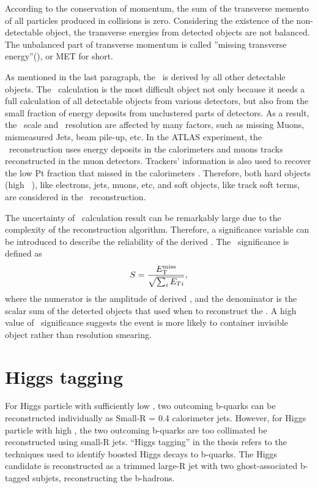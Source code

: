 \label{sec:met}
\par According to the conservation of momentum, the sum of the transverse memento of all particles produced in collisions is zero. Considering the existence of the non-detectable object, the transverse energies from detected objects are not balanced. The unbalanced part of transverse momentum is called ''missing transverse energy''(\met), or MET for short.

\par As mentioned in the last paragraph, the \met~is derived by all other detectable objects. The \met~calculation is the most difficult object not only because it needs a full calculation of all detectable objects from various detectors, but also from the small fraction of energy deposits from unclustered parts of detectors. As a result, the \met~scale and \met~resolution are affected by many factors, such as missing Muons, mismeasured Jets, beam pile-up, etc. In the ATLAS experiment, the \met~reconstruction uses energy deposits in the calorimeters and muons tracks reconstructed in the muon detectors. Trackers' information is also used to recover the low Pt fraction that missed in the calorimeters \cite{ATLAS-CONF-2013-082}. Therefore, both hard objects (high \pt~), like electrons, jets, muons, etc, and soft objects, like track soft terms, are considered in the \met~reconstruction.

\par The uncertainty of \met~calculation result can be remarkably large due to the complexity of the reconstruction algorithm. Therefore, a significance variable can be introduced to describe the reliability of the derived \met. The \met~significance is defined as
$$ S=\frac{E_{\mathrm{T}}^{\mathrm{miss}}}{\sqrt{\sum_{i}E_{Ti}}}, $$
where the numerator is the amplitude of derived \met, and the denominator is the scalar sum of the detected objects that used when to reconstruct the \met. A high value of \met~significance suggests the event is more likely to container invisible object rather than resolution smearing.

\section{Higgs tagging}
\label{sec:higgs}
\par For Higgs particle with sufficiently low \pt, two outcoming b-quarks can be reconstructed individually as Small-R = 0.4 calorimeter jets. However, for Higgs particle with high \pt, 
the two outcoming b-quarks are too collimated be reconstructed using small-R jets.
``Higgs tagging'' in the thesis refers to the techniques used to identify boosted Higgs decays to b-quarks. The Higgs candidate is reconstructed as a trimmed large-R jet 
with two ghost-associated b-tagged subjets, reconstructing the b-hadrons.
